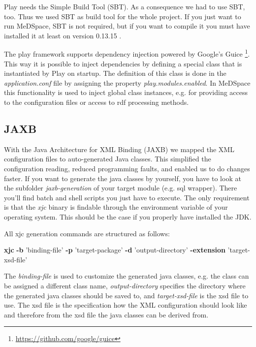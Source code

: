 Play needs the Simple Build Tool \cite{SBT}(SBT). As a consequence we had to use SBT, too. Thus we used SBT as build tool for the whole project. If you just want to run MeDSpace, SBT is not required, but if you want to compile it you must have installed it at least on version 0.13.15 . 

The play framework supports dependency injection powered by Google's Guice \footnote{\url{https://github.com/google/guice}}. This way it is possible to inject dependencies by defining a special class that is instantiated by Play on startup. The definition of this class is done in the \emph{application.conf} file by assigning the property \emph{play.modules.enabled}. In MeDSpace this functionality is used to inject global class instances, e.g. for providing access to the configuration files or access to rdf processing methods.

\subsection{JAXB}

With the Java Architecture for XML Binding \cite{JAXB} (JAXB) we mapped the XML configuration files to auto-generated Java classes. This simplified the configuration reading, reduced programming faults, and enabled us to do changes faster. If you want to generate the java classes by yourself, you have to look at the subfolder \emph{jaxb-generation} of your target module (e.g. sql wrapper). There you'll find batch and shell scripts you just have to execute. The only requirement is that the \emph{xjc} binary is findable through the environment variable of your operating system. This should be the case if you properly have installed the JDK.

All xjc generation commands are structured as follows:

\begin{codebox}
	\textbf{xjc} \textbf{-b} 'binding-file' \textbf{-p} 'target-package' \textbf{-d} 'output-directory' \textbf{-extension} 'target-xsd-file'
\end{codebox}

The \emph{binding-file} is used to customize the generated java classes, e.g. the class can be assigned a different class name, \emph{output-directory} specifies the directory where the generated java classes should be saved to, and \emph{target-xsd-file} is the xsd file to use. The xsd file is the specification how the XML configuration should look like and therefore from the xsd file the java classes can be derived from.

